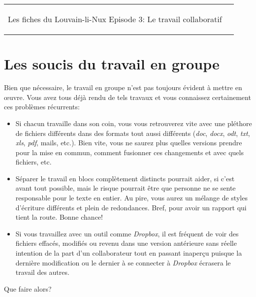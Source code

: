 



\begin{tabular}{p{13cm}r}
	\begin{center}{\Large Les fiches du Louvain-li-Nux\linebreak \linebreak
	\LARGE Episode 3: Le travail collaboratif}\end{center}
		&
	\usebox{\logollnux}
\end{tabular}
\vspace{-.5cm}

\section*{Les soucis du travail en groupe}
Bien que nécessaire,
le travail en groupe n'est pas toujours évident à mettre en \oe uvre. 
Vous avez tous déjà rendu de tels travaux et vous connaissez certainement ces problèmes récurrents:
\begin{itemize}
	\item Si chacun travaille dans son coin, vous vous retrouverez vite avec une pléthore de fichiers différents dans des formats tout aussi différents (\textit{doc}, \textit{docx}, \textit{odt}, \textit{txt}, \textit{xls}, \textit{pdf}, mails, etc.). Bien vite, vous ne saurez plus quelles versions prendre pour la mise en commun, comment fusionner ces changements et avec quels fichiers, etc.
	\item Séparer le travail en blocs complètement distincts pourrait aider, si c'est avant tout possible, mais le risque pourrait être que personne ne se sente responsable pour le texte en entier. Au pire, vous aurez un mélange de styles d'écriture différents et plein de redondances. Bref, pour avoir un rapport qui tient la route. Bonne chance!
	\item Si vous travaillez avec un outil comme \textit{Dropbox}, il est fréquent de voir des fichiers effacés, modifiés ou revenu dans une version antérieure sans réelle intention de la part d'un collaborateur tout en passant inaperçu puisque la dernière modification ou le dernier à se connecter à \textit{Dropbox} écrasera le travail des autres.
\end{itemize}
Que faire alors?

